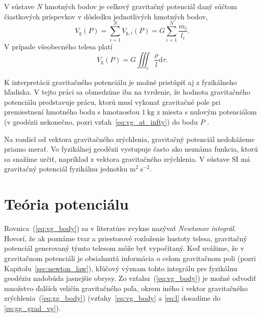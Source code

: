 \documentclass[a4paper, 12pt]{book}
\newcommand{\diff}{\mathrm d}
\newcommand{\gidx}{\mathrm g}
\begin{document}
V sústave $N$ hmotných bodov je celkový gravitačný potenciál daný súčtom 
čiastkových príspevkov v dôsledku jednotlivých hmotných bodov,
%
\begin{equation}
V_\gidx(P) = \sum_{i = 1}^{N} V_{\gidx,i}(P) = G \sum_{i = 1}^{N}\frac{
m_i}{l_i}{.}
\end{equation}
%
V prípade všeobecného telesa platí
%
\begin{equation}
\label{eq:vg_body}
V_\gidx(P) = G \iiint_{\tau} \frac{\rho}{l} \diff\tau{.}
\end{equation}

K interpretácii gravitačného potenciálu je možné pristúpiť aj z fyzikálneho 
hľadiska.  V tejto práci sa obmedzíme iba na tvrdenie, že hodnota gravitačného 
potenciálu predstavuje prácu, ktorú musí vykonať gravitačné pole pri 
premiestnení hmotného bodu s hmotnosťou $1\ \mathrm{kg}$ z miesta s nulovým 
potenciálom (v geodézii nekonečno, pozri vzťah~\ref{eq:vg_at_infty}) do bodu $P$ 
\citep{MacMillan1930,Kellogg1967,TorgeGeodesy}.

Na rozdiel od vektora gravitačného zrýchlenia, gravitačný potenciál nedokážeme 
priamo merať.  Vo fyzikálnej geodézii vystupuje často ako neznáma funkcia, 
ktorú sa snažíme určiť, napríklad z vektora gravitačného zrýchlenia.  V sústave 
SI má gravitačný potenciál fyzikálnu jednotku $\mathrm{m}^2\ \mathrm{s}^{-2}$.







\section{Teória potenciálu}

Rovnica~(\ref{eq:vg_body}) sa v literatúre zvykne nazývať \emph{Newtonov 
integrál}.  Hovorí, že ak poznáme tvar a priestorové rozloženie hustoty telesa, 
gravitačný potenciál generovaný týmto telesom môže byť vypočítaný.  Keď 
uvážime, že v gravitačnom potenciáli je obsiahnutá informácia o celom 
gravitačnom poli (pozri Kapitolu~\ref{sec:newton_law}), kľúčový význam tohto 
integrálu pre fyzikálnu geodéziu nadobúda jasnejšie obrysy.  Zo 
vzťahu~(\ref{eq:vg_body}) je možné odvodiť množstvo ďalších veličín 
gravitačného poľa, okrem iného i vektor gravitačného 
zrýchlenia~(\ref{eq:gg_body}) (vzťahy~\ref{eq:vg_body} a \ref{eq:l} dosadíme do 
\ref{eq:gg_grad_vg}).
\end{document}
